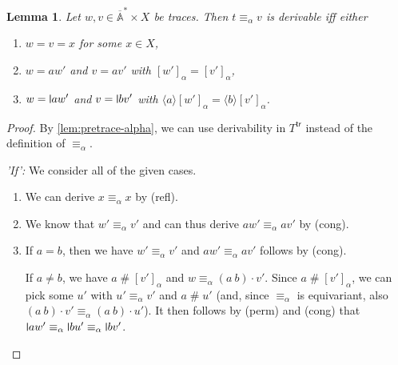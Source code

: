 \documentclass[11pt,a4paper]{amsart}
\newtheorem{lemma}[lemma]{Lemma}
\newcommand{\trc}{\mathsf{tr}}
\newcommand{\Names}{\mathbb{A}}
\newcommand{\barNames}{\overline{\Names}}
\newcommand{\alphaeq}{\equiv_\alpha}
\newcommand{\fresh}{\mathbin{\#}}
\newcommand{\bind}[1]{\langle #1\rangle}
\theoremstyle{plain}
\newcommand{\midmid}{\hspace{0.2ex}{\rule[-0.1ex]{0.6pt}{1.65ex}}\hspace{0.2ex}}
\newcommand{\newletter}[1]{{\midmid}#1}
\numberwithin{equation}{section}
\newcommand{\+}[1]{\mathcal{#1}\xspace}
\theoremstyle{definition}
\begin{document}
\begin{lemma}\label{lem:inductive-alphaeq}
  Let \(w, v \in \barNames^* \times X\) be traces. Then \(t \alphaeq v\) is derivable iff either
  \begin{enumerate}
    \item\label{itm:inductive-alphaeq-variable} \(w = v = x\) for some \(x \in X\),
    \item\label{itm:inductive-alphaeq-free} \(w = aw'\) and \(v = av'\) with \([w']_\alpha = [v']_\alpha\),
    \item\label{itm:inductive-alphaeq-bound} \(w = \newletter{a}w'\) and \(v = \newletter{b}v'\) with \(\bind{a}[w']_\alpha = \bind{b}[v']_\alpha\).
  \end{enumerate}
\end{lemma}

\begin{proof}
  By \cref{lem:pretrace-alpha}, we can use derivability in \(T^\trc\) instead of the definition of \(\alphaeq\).

  \noindent\emph{'If':}
  We consider all of the given cases.
  \begin{enumerate}
    \item
      We can derive \(x \alphaeq x\) by (refl).
    \item
      We know that \(w' \alphaeq v'\) and can thus derive \(aw' \alphaeq av'\) by (cong).
    \item
      If \(a = b\), then we have \(w' \alphaeq v'\) and \(aw' \alphaeq av'\) follows by (cong).

      If \(a \neq b\), we have \(a \fresh [v']_\alpha\) and \(w \alphaeq (a\ b) \cdot v'\).
      Since \(a \fresh [v']_\alpha\), we can pick some \(u'\) with \(u' \alphaeq v'\) and \(a \fresh u'\) (and, since $\alphaeq$ is equivariant, also \((a\ b) \cdot v' \alphaeq (a\ b) \cdot u'\)).
      It then follows by (perm) and (cong) that $\newletter{a}w' \alphaeq \newletter{b}u' \alphaeq \newletter{b}v'$.
  \end{enumerate}


\end{proof}
\end{document}
